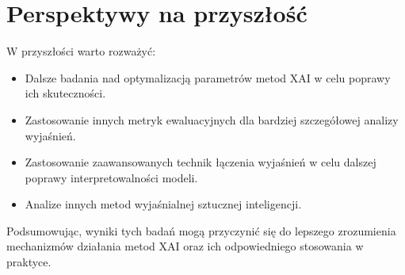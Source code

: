 \section*{Perspektywy na przyszłość}

W przyszłości warto rozważyć:
\begin{itemize}
    \item Dalsze badania nad optymalizacją parametrów metod XAI w celu poprawy ich skuteczności.
    \item Zastosowanie innych metryk ewaluacyjnych dla bardziej szczegółowej analizy wyjaśnień.
    \item Zastosowanie zaawansowanych technik łączenia wyjaśnień w celu dalszej poprawy interpretowalności modeli.
    \item Analize innych metod wyjaśnialnej sztucznej inteligencji.
\end{itemize}

Podsumowując, wyniki tych badań mogą przyczynić się do lepszego zrozumienia mechanizmów działania metod XAI oraz ich odpowiedniego stosowania w praktyce.
